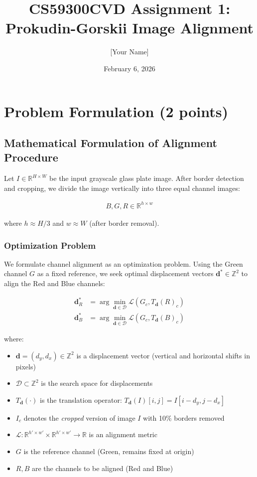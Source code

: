 \documentclass[11pt]{article}
\title{CS59300CVD Assignment 1: \\ Prokudin-Gorskii Image Alignment}
\author{[Your Name] \\ [Your Username]}
\date{February 6, 2026}
\begin{document}
\maketitle

\section{Problem Formulation (2 points)}

\subsection{Mathematical Formulation of Alignment Procedure}

Let $I \in \mathbb{R}^{H \times W}$ be the input grayscale glass plate image. After border detection and cropping, we divide the image vertically into three equal channel images:

\begin{align}
B, G, R \in \mathbb{R}^{h \times w}
\end{align}

where $h \approx H/3$ and $w \approx W$ (after border removal).

\subsubsection{Optimization Problem}

We formulate channel alignment as an optimization problem. Using the Green channel $G$ as a fixed reference, we seek optimal displacement vectors $\mathbf{d}^* \in \mathbb{Z}^2$ to align the Red and Blue channels:

\begin{align}
\mathbf{d}_R^* &= \arg\min_{\mathbf{d} \in \mathcal{D}} \mathcal{L}(G_c, T_{\mathbf{d}}(R)_c) \label{eq:opt_red}\\
\mathbf{d}_B^* &= \arg\min_{\mathbf{d} \in \mathcal{D}} \mathcal{L}(G_c, T_{\mathbf{d}}(B)_c) \label{eq:opt_blue}
\end{align}

where:
\begin{itemize}[leftmargin=*]
\item $\mathbf{d} = (d_y, d_x) \in \mathbb{Z}^2$ is a displacement vector (vertical and horizontal shifts in pixels)
\item $\mathcal{D} \subset \mathbb{Z}^2$ is the search space for displacements
\item $T_{\mathbf{d}}(\cdot)$ is the translation operator: $T_{\mathbf{d}}(I)[i,j] = I[i-d_y, j-d_x]$
\item $I_c$ denotes the \emph{cropped} version of image $I$ with 10\% borders removed
\item $\mathcal{L}: \mathbb{R}^{h' \times w'} \times \mathbb{R}^{h' \times w'} \to \mathbb{R}$ is an alignment metric
\item $G$ is the reference channel (Green, remains fixed at origin)
\item $R, B$ are the channels to be aligned (Red and Blue)
\end{itemize}
\end{document}
